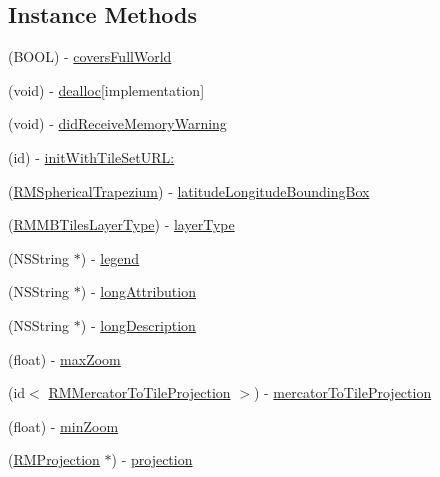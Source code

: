 \subsection*{Instance Methods}
\begin{DoxyCompactItemize}
\item 
(B\-O\-O\-L) -\/ \hyperlink{interface_r_m_m_b_tiles_tile_source_a79c6ebb930aed705a27b58c4d489d6d1}{covers\-Full\-World}
\item 
(void) -\/ \hyperlink{interface_r_m_m_b_tiles_tile_source_aea378c7d0d1c385bf5eeb8640f84bcb6}{dealloc}{\ttfamily  \mbox{[}implementation\mbox{]}}
\item 
(void) -\/ \hyperlink{interface_r_m_m_b_tiles_tile_source_a271c8c04b08b6cfb2a9f26cf4cf6b8fb}{did\-Receive\-Memory\-Warning}
\item 
(id) -\/ \hyperlink{interface_r_m_m_b_tiles_tile_source_a5440bebc2b66e5a49e0e74f2eddd4765}{init\-With\-Tile\-Set\-U\-R\-L\-:}
\item 
(\hyperlink{struct_r_m_spherical_trapezium}{R\-M\-Spherical\-Trapezium}) -\/ \hyperlink{interface_r_m_m_b_tiles_tile_source_a3916d8c4aa1c2a9943c9dcafcfb30b97}{latitude\-Longitude\-Bounding\-Box}
\item 
(\hyperlink{_r_m_m_b_tiles_tile_source_8h_a3ce7ea9300fb4b15a8031a62d1eef46c}{R\-M\-M\-B\-Tiles\-Layer\-Type}) -\/ \hyperlink{interface_r_m_m_b_tiles_tile_source_a8c6bc51a2878a1b462fa50004275f6bc}{layer\-Type}
\item 
(N\-S\-String $\ast$) -\/ \hyperlink{interface_r_m_m_b_tiles_tile_source_a8ec303f6909f461a5d33eb32e6f01a06}{legend}
\item 
(N\-S\-String $\ast$) -\/ \hyperlink{interface_r_m_m_b_tiles_tile_source_aedb3c1daf42a85b1037c719866ffabf7}{long\-Attribution}
\item 
(N\-S\-String $\ast$) -\/ \hyperlink{interface_r_m_m_b_tiles_tile_source_a437c5306c3918390b4ed9fda136c7b90}{long\-Description}
\item 
(float) -\/ \hyperlink{interface_r_m_m_b_tiles_tile_source_aeb23cf513462e0f3e907a7f3264009d9}{max\-Zoom}
\item 
(id$<$ \hyperlink{protocol_r_m_mercator_to_tile_projection-p}{R\-M\-Mercator\-To\-Tile\-Projection} $>$) -\/ \hyperlink{interface_r_m_m_b_tiles_tile_source_ab9abfb26588460e39c90eec6f0fe8758}{mercator\-To\-Tile\-Projection}
\item 
(float) -\/ \hyperlink{interface_r_m_m_b_tiles_tile_source_a8322d0c266bb2f26f1b3331f16f6a426}{min\-Zoom}
\item 
(\hyperlink{interface_r_m_projection}{R\-M\-Projection} $\ast$) -\/ \hyperlink{interface_r_m_m_b_tiles_tile_source_ae36211d298346afbebb04b8427023832}{projection}

\end{DoxyCompactItemize}
